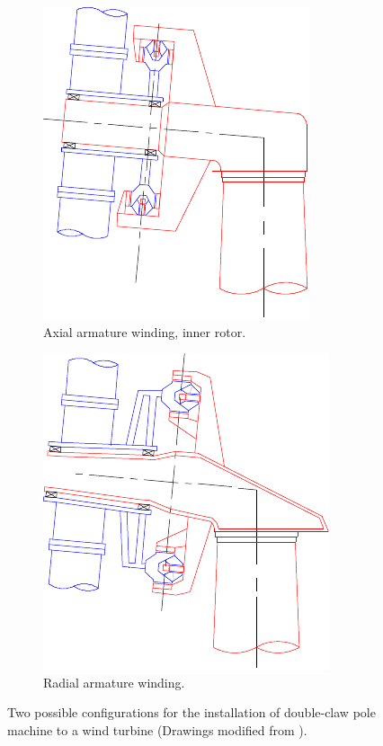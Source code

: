 \documentclass[12pt]{iopart}
\begin{document}
\begin{figure}[h!]
  \centering
  \begin{subfigure}{.4\columnwidth}
  \includegraphics[scale=1.2]{structure_claw_radial_inner}
  \caption{Axial armature winding, inner rotor.}
  \label{structure1}
  \end{subfigure}
  \begin{subfigure}{.4\columnwidth}
  \includegraphics[scale=1.2]{structure_claw_axial}
  \caption{Radial armature winding.}
  \label{structure2}
  \end{subfigure}

  \caption{Two possible configurations for the installation of double-claw pole machine to a wind turbine (Drawings modified from \cite{Bang2010}).} 
  \label{DD_claw_pole_structures}
\end{figure}
\end{document}
